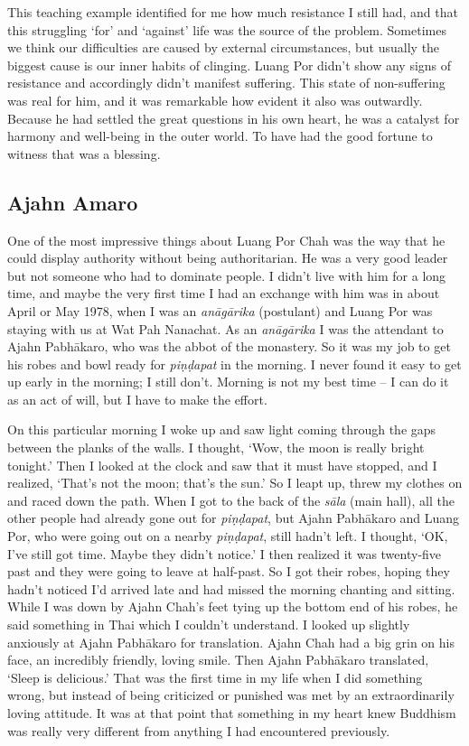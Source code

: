 This teaching example identified for me how much resistance I still had, 
and that this struggling `for' and `against' life was the source of the
problem. Sometimes we think our difficulties are caused by external
circumstances, but usually the biggest cause is our inner habits of
clinging. Luang Por didn't show any signs of resistance and accordingly
didn't manifest suffering. This state of non-suffering was real for him, 
and it was remarkable how evident it also was outwardly. Because he had
settled the great questions in his own heart, he was a catalyst for
harmony and well-being in the outer world. To have had the good fortune
to witness that was a blessing. 

\subsection{Ajahn Amaro}

One of the most impressive things about Luang Por Chah was the way that
he could display authority without being authoritarian. He was a very
good leader but not someone who had to dominate people. I didn't live
with him for a long time, and maybe the very first time I had an
exchange with him was in about April or May 1978, when I was an
\emph{anāgārika} (postulant) and Luang Por was staying with us at Wat
Pah Nanachat. As an \emph{anāgārika} I was the attendant to Ajahn
Pabhākaro, who was the abbot of the monastery. So it was my job to get
his robes and bowl ready for \emph{piṇḍapat} in the morning. I never
found it easy to get up early in the morning; I still don't. Morning is
not my best time -- I can do it as an act of will, but I have to make
the effort. 

On this particular morning I woke up and saw light coming through the
gaps between the planks of the walls. I thought, `Wow, the moon is
really bright tonight.' Then I looked at the clock and saw that it must
have stopped, and I realized, `That's not the moon; that's the sun.' So
I leapt up, threw my clothes on and raced down the path. When I got to
the back of the \emph{sāla} (main hall), all the other people had
already gone out for \emph{piṇḍapat}, but Ajahn Pabhākaro and Luang Por, 
who were going out on a nearby \emph{piṇḍapat}, still hadn't left. I
thought, `OK, I've still got time. Maybe they didn't notice.' I then
realized it was twenty-five past and they were going to leave at
half-past. So I got their robes, hoping they hadn't noticed I'd arrived
late and had missed the morning chanting and sitting. While I was down
by Ajahn Chah's feet tying up the bottom end of his robes, he said
something in Thai which I couldn't understand. I looked up slightly
anxiously at Ajahn Pabhākaro for translation. Ajahn Chah had a big grin
on his face, an incredibly friendly, loving smile. Then Ajahn Pabhākaro
translated, `Sleep is delicious.' That was the first time in my life
when I did something wrong, but instead of being criticized or punished
was met by an extraordinarily loving attitude. It was at that point that
something in my heart knew Buddhism was really very different from
anything I had encountered previously. 

